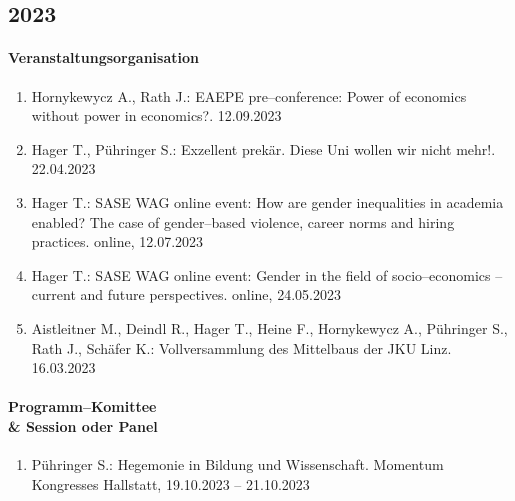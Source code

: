 \subsection*{2023}
\paragraph{Veranstaltungsorganisation}
\begin{enumerate}[leftmargin=*, labelsep=0.5cm]
\item Hornykewycz A., Rath J.: EAEPE pre--conference: Power of economics without power in economics?. 12.09.2023
\item Hager T., Pühringer S.: Exzellent prekär. Diese Uni wollen wir nicht mehr!. 22.04.2023
\item Hager T.: SASE WAG online event: How are gender inequalities in academia enabled? The case of gender--based violence, career norms and hiring practices. online, 12.07.2023
\item Hager T.: SASE WAG online event: Gender in the field of socio--economics – current and future perspectives. online, 24.05.2023
\item Aistleitner M., Deindl R., Hager T., Heine F., Hornykewycz A., Pühringer S., Rath J., Schäfer K.: Vollversammlung des Mittelbaus der JKU Linz. 16.03.2023
\end{enumerate}

\paragraph{Programm--Komittee \\\& Session oder Panel}
\begin{enumerate}[leftmargin=*, labelsep=0.5cm]
\item Pühringer S.: Hegemonie in Bildung und Wissenschaft. Momentum Kongresses Hallstatt, 19.10.2023 -- 21.10.2023
\end{enumerate}

